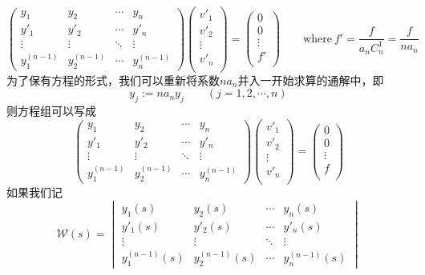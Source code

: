 \[
\begin{pmatrix}
    y_1 & y_2 & \cdots & y_n \\
    y'_1 & y'_2 & \cdots & y'_n \\
    \vdots & \vdots & \ddots & \vdots \\
    y^{(n-1)}_1 & y^{(n-1)}_2 & \cdots & y^{(n-1)}_n
\end{pmatrix}    
\begin{pmatrix}
    v'_1 \\ v'_2 \\ \vdots \\ v'_n \\
\end{pmatrix}   
=
\begin{pmatrix}
    0 \\ 0 \\ \vdots \\ f' \\
\end{pmatrix}     
\qquad \text{where} \ f'=\frac{f}{a_{n}C_{n}^1}=\frac{f}{na_{n}}
\]
为了保有方程的形式，我们可以重新将系数$na_n$并入一开始求算的通解中，即
\[y_j:=na_ny_j \qquad (j=1,2,\cdots,n)\]
则方程组可以写成
\[
\begin{pmatrix}
    y_1 & y_2 & \cdots & y_n \\
    y'_1 & y'_2 & \cdots & y'_n \\
    \vdots & \vdots & \ddots & \vdots \\
    y^{(n-1)}_1 & y^{(n-1)}_2 & \cdots & y^{(n-1)}_n
\end{pmatrix}    
\begin{pmatrix}
    v'_1 \\ v'_2 \\ \vdots \\ v'_n \\
\end{pmatrix}   
=
\begin{pmatrix}
    0 \\ 0 \\ \vdots \\ f \\
\end{pmatrix}     
\]
如果我们记
\[
\mathcal{W}(s)=
\begin{vmatrix}
    y_1(s) & y_2(s) & \cdots & y_n(s) \\
    y'_1(s) & y'_2(s) & \cdots & y'_n(s) \\
    \vdots & \vdots & \ddots & \vdots \\
    y^{(n-1)}_1(s) & y^{(n-1)}_2(s) & \cdots & y^{(n-1)}_n(s)
\end{vmatrix}  
\]
